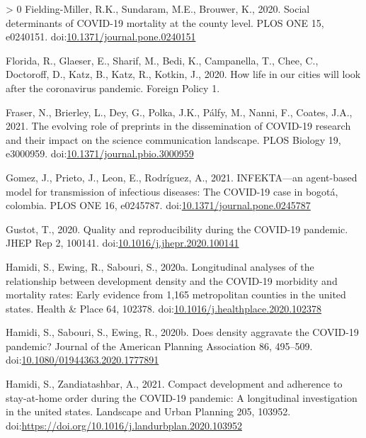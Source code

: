 \documentclass[]{elsarticle} %
\newlength{\cslhangindent}
\newenvironment{CSLReferences}[3] %
 {%
  \setlength{\parindent}{0pt}
  \ifodd #1 \everypar{\setlength{\hangindent}{\cslhangindent}}\ignorespaces\fi
  \ifnum #2 > 0
  \setlength{\parskip}{#2\baselineskip}
  \fi
 }%
 {}
\begin{document}
\begin{CSLReferences}{1}{0}
\leavevmode\hypertarget{ref-Fielding2020social}{}%
Fielding-Miller, R.K., Sundaram, M.E., Brouwer, K., 2020. Social
determinants of COVID-19 mortality at the county level. PLOS ONE 15,
e0240151.
doi:\href{https://doi.org/10.1371/journal.pone.0240151}{10.1371/journal.pone.0240151}

\leavevmode\hypertarget{ref-Florida2020how}{}%
Florida, R., Glaeser, E., Sharif, M., Bedi, K., Campanella, T., Chee,
C., Doctoroff, D., Katz, B., Katz, R., Kotkin, J., 2020. How life in our
cities will look after the coronavirus pandemic. Foreign Policy 1.

\leavevmode\hypertarget{ref-Fraser2021evolving}{}%
Fraser, N., Brierley, L., Dey, G., Polka, J.K., Pálfy, M., Nanni, F.,
Coates, J.A., 2021. The evolving role of preprints in the dissemination
of COVID-19 research and their impact on the science communication
landscape. PLOS Biology 19, e3000959.
doi:\href{https://doi.org/10.1371/journal.pbio.3000959}{10.1371/journal.pbio.3000959}

\leavevmode\hypertarget{ref-Gomez2021infekta}{}%
Gomez, J., Prieto, J., Leon, E., Rodríguez, A., 2021. INFEKTA---an
agent-based model for transmission of infectious diseases: The COVID-19
case in bogotá, colombia. PLOS ONE 16, e0245787.
doi:\href{https://doi.org/10.1371/journal.pone.0245787}{10.1371/journal.pone.0245787}

\leavevmode\hypertarget{ref-Gustot2020quality}{}%
Gustot, T., 2020. Quality and reproducibility during the COVID-19
pandemic. JHEP Rep 2, 100141.
doi:\href{https://doi.org/10.1016/j.jhepr.2020.100141}{10.1016/j.jhepr.2020.100141}

\leavevmode\hypertarget{ref-Hamidi2020longitudinal}{}%
Hamidi, S., Ewing, R., Sabouri, S., 2020a. Longitudinal analyses of the
relationship between development density and the COVID-19 morbidity and
mortality rates: Early evidence from 1,165 metropolitan counties in the
united states. Health \& Place 64, 102378.
doi:\href{https://doi.org/10.1016/j.healthplace.2020.102378}{10.1016/j.healthplace.2020.102378}

\leavevmode\hypertarget{ref-Hamidi2020density}{}%
Hamidi, S., Sabouri, S., Ewing, R., 2020b. Does density aggravate the
COVID-19 pandemic? Journal of the American Planning Association 86,
495--509.
doi:\href{https://doi.org/10.1080/01944363.2020.1777891}{10.1080/01944363.2020.1777891}

\leavevmode\hypertarget{ref-Hamidi2021compact}{}%
Hamidi, S., Zandiatashbar, A., 2021. Compact development and adherence
to stay-at-home order during the COVID-19 pandemic: A longitudinal
investigation in the united states. Landscape and Urban Planning 205,
103952. doi:\url{https://doi.org/10.1016/j.landurbplan.2020.103952}


\end{CSLReferences}
\end{document}
